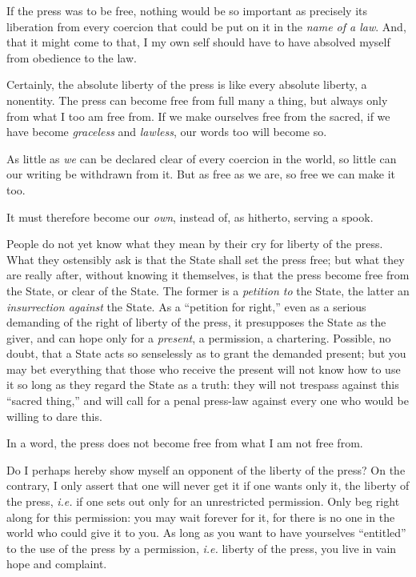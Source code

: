 If the press was to be free, nothing would be so important as precisely its 
liberation from every coercion that could be put on it in the \textit{name of 
a law}. And, that it might come to that, I my own self should have to have 
absolved myself from obedience to the law.

Certainly, the absolute liberty of the press is like every absolute liberty, a 
nonentity. The press can become free from full many a thing, but always only 
from what I too am free from. If we make ourselves free from the sacred, if we 
have become \textit{graceless} and \textit{lawless}, our words too will become 
so.

As little as \textit{we} can be declared clear of every coercion in the world, 
so little can our writing be withdrawn from it. But as free as we are, so free 
we can make it too.

It must therefore become our \textit{own}, instead of, as hitherto, serving a 
spook.

People do not yet know what they mean by their cry for liberty of the press. 
What they ostensibly ask is that the State shall set the press free; but what 
they are really after, without knowing it themselves, is that the press become 
free from the State, or clear of the State. The former is a \textit{petition 
to} the State, the latter an \textit{insurrection against} the State. As a 
``petition for right,'' even as a serious demanding of the right of liberty 
of the press, it presupposes the State as the giver, and can hope only for a 
\textit{present}, a permission, a chartering. Possible, no doubt, that a State 
acts so senselessly as to grant the demanded present; but you may bet 
everything that those who receive the present will not know how to use it so 
long as they regard the State as a truth: they will not trespass against this 
``sacred thing,'' and will call for a penal press-law against every one who 
would be willing to dare this.

In a word, the press does not become free from what I am not free from.

Do I perhaps hereby show myself an opponent of the liberty of the press? On 
the contrary, I only assert that one will never get it if one wants only it, 
the liberty of the press, \textit{i.e.} if one sets out only for an 
unrestricted permission. Only beg right along for this permission: you may 
wait forever for it, for there is no one in the world who could give it to 
you. As long as you want to have yourselves ``entitled'' to the use of the 
press by a permission, \textit{i.e.} liberty of the press, you live in vain 
hope and complaint.

